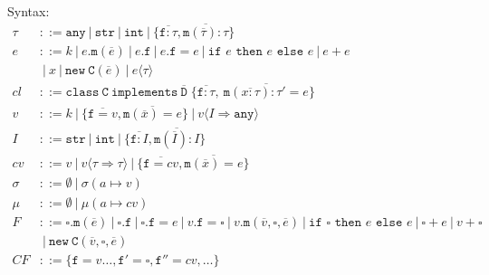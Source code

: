 \documentclass{report}
\newcommand{\intt}{\texttt{int}}
\newcommand{\any}{\anyt}
\newcommand{\coerce}{\Rightarrow}
\newcommand{\strt}{\texttt{str}}
\newcommand{\anyt}{\texttt{any}}
\newcommand{\ifthenelse}[3]{\texttt{if }#1\texttt{ then }#2\texttt{ else }#3}
\newcommand{\cast}[1]{\langle #1\rangle}
\newcommand{\xt}[1]{\texttt{#1}}
\begin{document}
\newcommand{\s}{\sigma}
\renewcommand{\sc}{\mu}
\renewcommand{\t}{\tau}
\newcommand{\B}{\ensuremath{~|~}\xspace}
\newcommand{\new}{\ensuremath{\texttt{new}}\xspace}
\newcommand{\NEW}[2]{\ensuremath{  \new ~ #1 ( #2 )}\xspace}
\renewcommand{\bar}[1]{\ensuremath{\overline{ #1} }\xspace}

\newcommand{\m}{\ensuremath{\xt{m}}\xspace}
\newcommand{\f}{\ensuremath{\xt{f}}\xspace}
\newcommand{\C}{\ensuremath{\xt{C}}\xspace}
\newcommand{\D}{\ensuremath{\xt{D}}\xspace}




\newcommand{\cl}{\mathit{cl}\xspace}
\newcommand{\implements}{\xt{implements}\xspace}

\newcommand{\CLASS}[3]{ \ensuremath{  \xt{class}~#1~\implements~#2\;\{ #3 \}}\xspace} 
\newcommand{\MDEF}[4] { #1( #2 ):#3 = #4}
\newcommand{\MVAL}[3] { #1( #2 ) = #3}

Syntax:
\begin{align*}
\t &::= \anyt \B  \strt \B  \intt \B  \{\bar{\f :\t},\bar{\m (\bar{\t}):\t}\}\\
e &::= k \B  e.\m(\bar{e}) \B e.\f  \B e.\f  = e \B  \ifthenelse{e}{e}{e}\B e + e \\
&\B x\B \NEW \C {\bar{e}} \B  e\cast{\t}\\
\cl &::= \CLASS \C {\bar \D} { \bar{ \f : \t }, ~ \bar{ \MDEF{\m}{\bar{x :\t}}{\t'}{e} } } \\
v &::= k \B  \{\bar{\texttt{f}=v},\bar{\m (\bar x)=e}\} \B  v\cast{I \coerce \any}\\
I &::= \strt \B  \intt \B  \{\bar{\f :I},\bar{\m (\bar{I}):I}\}\\
cv &::= v \B  v\cast{\t \coerce \t} \B  \{\bar{\f=cv},\bar{ \MVAL\m{\bar x}e }\}\\
\s &::= \emptyset \B  \s( a \mapsto v )\\
\sc &::= \emptyset \B  \sc( a \mapsto cv )\\
F &::=    \square.\m(\bar e) 
   \B 	  \square.\f 
   \B 	  \square.\f  = e
   \B     v.\f  = \square
   \B     v.\m(\bar v,\square, \bar e) 
   \B     \ifthenelse{\square}{e}{e} 
   \B     \square + e 
   \B      v + \square\\
&\B \NEW  \C {\bar{v},\square,\bar{e}}\\
\mathit{CF} &::= \{\f=v\ldots,\f'=\square,\f''=cv,\ldots\}\\
\end{align*}
\end{document}

